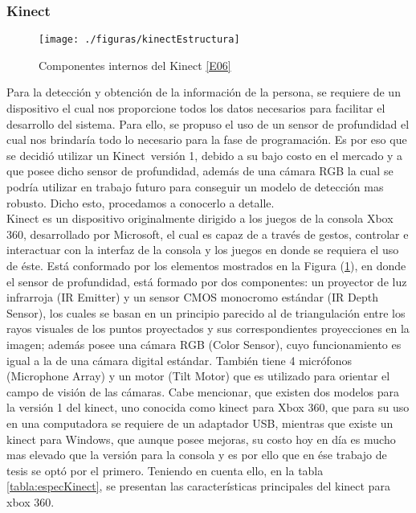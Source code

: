 \documentclass[a4paper,openright,12pt]{report}
\begin{document}
\subsubsection{Kinect}
\begin{figure}[thb]
	\centering
	\texttt{[image: ./figuras/kinectEstructura]}
	\caption[Componentes internos del Kinect]{Componentes internos del Kinect \hyperlink{e06}{[E06]}} \label{fig:kinectEstructura}
\end{figure}
Para la detección y obtención de la información de la persona, se requiere de un dispositivo el cual nos proporcione todos los datos necesarios para facilitar el desarrollo del sistema. Para ello, se propuso el uso de un sensor de profundidad el cual nos brindaría todo lo necesario para la fase de programación. Es por eso que se decidió utilizar un Kinect\textregistered\ versión 1, debido a su bajo costo en el mercado y a que posee dicho sensor de profundidad, además de una cámara RGB la cual se podría utilizar en trabajo futuro para conseguir un modelo de detección mas robusto. Dicho esto, procedamos a conocerlo a detalle.\\
Kinect es un dispositivo originalmente dirigido a los juegos de la consola Xbox 360\textregistered, desarrollado por Microsoft, el cual es capaz de a través de gestos, controlar e interactuar con la interfaz de la consola y los juegos en donde se requiera el uso de éste. Está conformado por los elementos mostrados en la Figura (\ref{fig:kinectEstructura}), en donde el sensor de profundidad, está formado por dos componentes: un proyector de luz infrarroja (IR Emitter) y un sensor CMOS monocromo estándar (IR Depth Sensor), los cuales se basan en un principio parecido al de triangulación entre los rayos visuales de los puntos proyectados y sus correspondientes proyecciones en la imagen; además posee una cámara RGB (Color Sensor), cuyo funcionamiento es igual a la de una cámara digital estándar. También tiene 4 micrófonos (Microphone Array) y un motor (Tilt Motor) que es utilizado para orientar el campo de visión de las cámaras. Cabe mencionar, que existen dos modelos para la versión 1 del kinect, uno conocida como kinect para Xbox 360, que para su uso en una computadora se requiere de un adaptador USB, mientras que existe un kinect para Windows, que aunque posee mejoras, su costo hoy en día es mucho mas elevado que la versión para la consola y es por ello que en ése trabajo de tesis se optó por el primero. Teniendo en cuenta ello, en la tabla \ref{tabla:especKinect}, se presentan las características principales del kinect para xbox 360.\\
\end{document}
